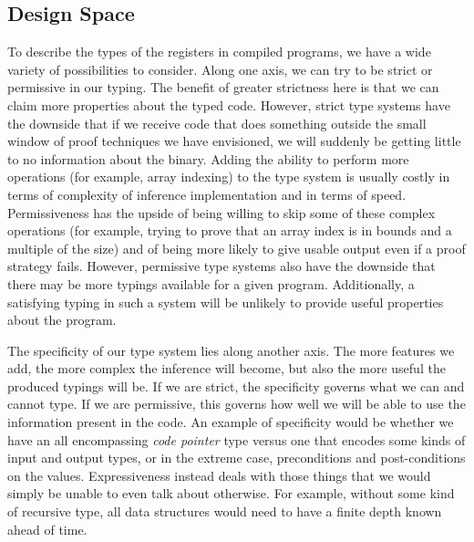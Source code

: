\subsection{Design Space}
To describe the types of the registers in compiled programs, we have a wide variety of possibilities to consider. Along one axis, we can try to be strict or permissive in our typing. The benefit of greater strictness here is that we can claim more properties about the typed code. However, strict type systems have the downside that if we receive code that does something outside the small window of proof techniques we have envisioned, we will suddenly be getting little to no information about the binary. Adding the ability to perform more operations (for example, array indexing) to the type system is usually costly in terms of complexity of inference implementation and in terms of speed. Permissiveness has the upside of being willing to skip some of these complex operations (for example, trying to prove that an array index is in bounds and a multiple of the size) and of being more likely to give usable output even if a proof strategy fails. However, permissive type systems also have the downside that there may be more typings available for a given program. Additionally, a satisfying typing in such a system will be unlikely to provide useful properties about the program.

The specificity of our type system lies along another axis.
The more features we add, the more complex the inference will become, but also the more useful the produced typings will be. If we are strict, the specificity governs what we can and cannot type. If we are permissive, this governs how well we will be able to use the information present in the code. An example of specificity would be whether we have an all encompassing \emph{code pointer} type versus one that encodes some kinds of input and output types, or in the extreme case, preconditions and post-conditions on the values. Expressiveness instead deals with those things that we would simply be unable to even talk about otherwise. For example, without some kind of recursive type, all data structures would need to have a finite depth known ahead of time.

